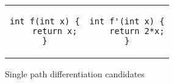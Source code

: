 \begin{figure}
\centering
\begin{tabular}{cc}
\begin{lstlisting}
int f(int x) {
    return x;
}
\end{lstlisting}
\hspace{1cm}
&
\begin{lstlisting}
int f'(int x) {
    return 2*x;
}
\end{lstlisting}
\end{tabular}
\caption{Single path differentiation candidates}
\end{figure}
